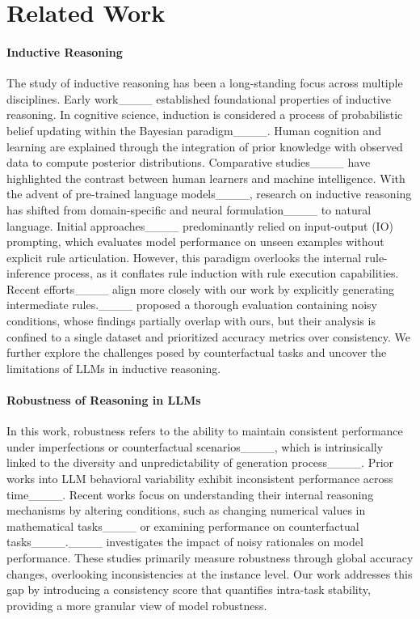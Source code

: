 \section{Related Work}
\paragraph{Inductive Reasoning} The study of inductive reasoning has been a long-standing focus across multiple disciplines. Early work____ established foundational properties of inductive reasoning. In cognitive science, induction is considered a process of probabilistic belief updating within the Bayesian paradigm____. Human cognition and learning are explained through the integration of prior knowledge with observed data to compute posterior distributions. Comparative studies____ have highlighted the contrast between human learners and machine intelligence.
With the advent of pre-trained language models____, research on inductive reasoning has shifted from domain-specific and neural formulation____ to natural language. Initial approaches____ predominantly relied on input-output (IO) prompting, which evaluates model performance on unseen examples without explicit rule articulation. However, this paradigm overlooks the internal rule-inference process, as it conflates rule induction with rule execution capabilities. Recent efforts____ align more closely with our work by explicitly generating intermediate rules.____ proposed a thorough evaluation containing noisy conditions, whose findings partially overlap with ours, but their analysis is confined to a single dataset and prioritized accuracy metrics over consistency. We further explore the challenges posed by counterfactual tasks and uncover the limitations of LLMs in inductive reasoning.

\paragraph{Robustness of Reasoning in LLMs}
In this work, robustness refers to the ability to maintain consistent performance under imperfections or counterfactual scenarios____, which is intrinsically linked to the diversity and unpredictability of generation process____. Prior works into LLM behavioral variability exhibit inconsistent performance across time____. Recent works focus on understanding their internal reasoning mechanisms by altering conditions, such as changing numerical values in mathematical tasks____ or examining performance on counterfactual tasks____.____ investigates the impact of noisy rationales on model performance. These studies primarily measure robustness through global accuracy changes, overlooking inconsistencies at the instance level. Our work addresses this gap by introducing a consistency score that quantifies intra-task stability, providing a more granular view of model robustness.